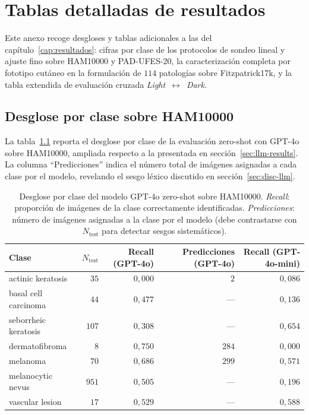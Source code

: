
\chapter{Tablas detalladas de resultados}
\label{anexo:tablas}
\label{cap:anexob}

Este anexo recoge desgloses y tablas adicionales a las del
capítulo~\ref{cap:resultados}: cifras por clase de los protocolos
de sondeo lineal y ajuste fino sobre HAM10000 y PAD-UFES-20, la
caracterización completa por fototipo cutáneo en la formulación de
$114$ patologías sobre Fitzpatrick17k, y la tabla extendida
de evaluación cruzada \emph{Light}~$\leftrightarrow$~\emph{Dark}.

\section{Desglose por clase sobre HAM10000}
\label{sec:anexob-ham}

La tabla~\ref{tab:anexob-perclass-gpt4o} reporta el desglose por
clase de la evaluación zero-shot con GPT-4o sobre HAM10000,
ampliada respecto a la presentada en
secci\'on~\ref{sec:llm-results}. La columna ``Predicciones'' indica el
número total de imágenes asignadas a cada clase por el modelo,
revelando el sesgo léxico discutido en secci\'on~\ref{sec:disc-llm}.

\begin{table}[H]
\centering
\footnotesize
\setlength{\tabcolsep}{4pt}
\renewcommand{\arraystretch}{0.95}
\caption{Desglose por clase del modelo GPT-4o zero-shot sobre
HAM10000. \emph{Recall}: proporción de imágenes de la clase
correctamente identificadas. \emph{Predicciones}: número de
imágenes asignadas a la clase por el modelo (debe contrastarse
con $N_{\mathrm{test}}$ para detectar sesgos sistemáticos).}
\label{tab:anexob-perclass-gpt4o}
\begin{tabular}{lrrrr}
\hline
Clase                       & $N_{\mathrm{test}}$ & Recall (GPT-4o) & Predicciones (GPT-4o) & Recall (GPT-4o-mini) \\
\hline
actinic keratosis           & $35$    & $0{,}000$ & $2$    & $0{,}086$ \\
basal cell carcinoma        & $44$    & $0{,}477$ & ---    & $0{,}136$ \\
seborrheic keratosis        & $107$   & $0{,}308$ & ---    & $0{,}654$ \\
dermatofibroma              & $8$     & $0{,}750$ & $284$  & $0{,}000$ \\
melanoma                    & $70$    & $0{,}686$ & $299$  & $0{,}571$ \\
melanocytic nevus           & $951$   & $0{,}505$ & ---    & $0{,}196$ \\
vascular lesion             & $17$    & $0{,}529$ & ---    & $0{,}588$ \\
\hline
\end{tabular}
\end{table}

